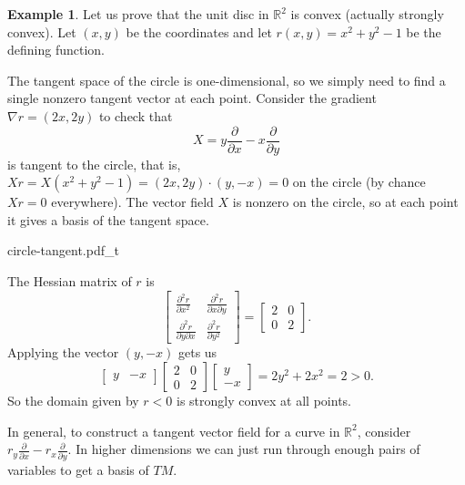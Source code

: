\documentclass[12pt,openany]{book}
\newcommand{\R}{{\mathbb{R}}}
\theoremstyle{plain}
\theoremstyle{remark}
\theoremstyle{definition}
\newenvironment{myfig}{%
    \begin{center}
}{%
    \end{center}
}
\theoremstyle{exercise}
\theoremstyle{example}
\newtheorem{example}[thm]{Example}
\begin{document}
\begin{example}
Let us prove that the unit disc in $\R^2$ is
convex (actually strongly convex).  Let $(x,y)$ be the coordinates and
let $r(x,y) = x^2+y^2-1$ be the 
defining function.

The tangent space of the circle is one-dimensional, so we simply need to
find a single nonzero tangent vector at each point.
Consider the gradient
%
$\nabla r = (2x,2y)$ to check that
\begin{equation*}
X = y \frac{\partial}{\partial x} - x \frac{\partial}{\partial y}
\end{equation*}
is tangent to the circle, that is,
$Xr = X(x^2+y^2-1) = (2x,2y) \cdot (y,-x) = 0$ on the circle
(by chance $Xr=0$ everywhere).
The vector field $X$ is nonzero on the circle, so at each point it gives a
basis of the tangent space.
\begin{myfig}
{circle-tangent.pdf_t}
\end{myfig}

The Hessian matrix of $r$ is
\begin{equation*}
\begin{bmatrix}
\frac{\partial^2 r}{\partial x^2} &
\frac{\partial^2 r}{\partial x \partial y} \\
\frac{\partial^2 r}{\partial y \partial x} &
\frac{\partial^2 r}{\partial y^2}
\end{bmatrix}
=
\begin{bmatrix}
2 & 0 \\
0 & 2
\end{bmatrix} .
\end{equation*}
Applying the vector $(y,-x)$ gets us
\begin{equation*}
\begin{bmatrix}
y & -x
\end{bmatrix}
\begin{bmatrix}
2 & 0 \\
0 & 2
\end{bmatrix}
\begin{bmatrix}
y \\ -x
\end{bmatrix}
=
2y^2+2x^2 = 2 > 0 .
\end{equation*}
So the domain given by $r < 0$ is strongly convex at all points.
\end{example}

In general, to construct a tangent vector field for
a curve in $\R^2$,
consider
$r_y \frac{\partial}{\partial x} - r_x \frac{\partial}{\partial y}$.  In
higher dimensions we can just run through enough pairs of variables to get
a basis of $TM$.
\end{document}
